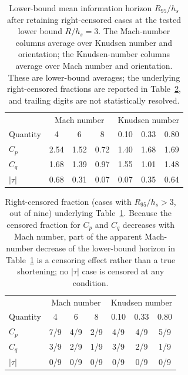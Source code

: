 \documentclass[aip,pof,preprint,notitlepage,floatfix,amsmath,amssymb]{revtex4-2}
\begin{document}
\begin{table}[t]
\centering
\caption{Lower-bound mean information horizon $R_{95}/h_s$ after retaining right-censored cases at the tested lower bound $R/h_s=3$. The Mach-number columns average over Knudsen number and orientation; the Knudsen-number columns average over Mach number and orientation. These are lower-bound averages; the underlying right-censored fractions are reported in Table~\ref{tab:R95censored}, and trailing digits are not statistically resolved.}
\label{tab:R95MaKn}
\begin{tabular}{lcccccc}
\toprule
& \multicolumn{3}{c}{Mach number} & \multicolumn{3}{c}{Knudsen number} \\
Quantity & 4 & 6 & 8 & 0.10 & 0.33 & 0.80 \\
\midrule
$C_p$ & 2.54 & 1.52 & 0.72 & 1.40 & 1.68 & 1.69 \\
$C_q$ & 1.68 & 1.39 & 0.97 & 1.55 & 1.01 & 1.48 \\
$|\tau|$ & 0.68 & 0.31 & 0.07 & 0.07 & 0.35 & 0.64 \\
\bottomrule
\end{tabular}
\end{table}

\begin{table}[t]
\centering
\caption{Right-censored fraction (cases with $R_{95}/h_s>3$, out of nine) underlying Table~\ref{tab:R95MaKn}. Because the censored fraction for $C_p$ and $C_q$ decreases with Mach number, part of the apparent Mach-number decrease of the lower-bound horizon in Table~\ref{tab:R95MaKn} is a censoring effect rather than a true shortening; no $|\tau|$ case is censored at any condition.}
\label{tab:R95censored}
\begin{tabular}{lcccccc}
\toprule
& \multicolumn{3}{c}{Mach number} & \multicolumn{3}{c}{Knudsen number} \\
Quantity & 4 & 6 & 8 & 0.10 & 0.33 & 0.80 \\
\midrule
$C_p$    & 7/9 & 4/9 & 2/9 & 4/9 & 4/9 & 5/9 \\
$C_q$    & 3/9 & 2/9 & 1/9 & 3/9 & 2/9 & 1/9 \\
$|\tau|$ & 0/9 & 0/9 & 0/9 & 0/9 & 0/9 & 0/9 \\
\bottomrule
\end{tabular}
\end{table}
\end{document}
